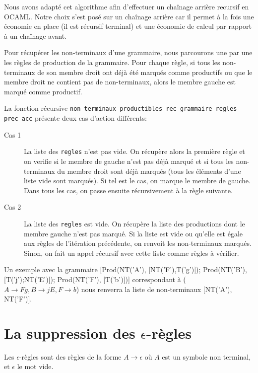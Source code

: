 \documentclass[11pt,a4paper]{article}
\def\code#1{\texttt{#1}} %
\begin{document}
Nous avons adapté cet algorithme afin d'effectuer un chaînage arrière recursif en OCAML. Notre choix s'est posé sur un chaînage arrière car il permet à la fois une économie en place (il est récursif terminal) et une économie de calcul par rapport à un chaînage avant.
\newline

Pour récupérer les non-terminaux d'une grammaire, nous parcourons une par une les règles 
de production de la grammaire. Pour chaque règle, si tous les non-terminaux de son membre droit ont déjà  été marqués comme productifs ou que le membre droit ne contient pas de non-terminaux, alors le membre gauche est marqué comme productif.

La fonction récursive \code{non\_terminaux\_productibles\_rec grammaire regles prec acc} présente deux cas d'action différents:

\begin{description}
    \item[Cas 1] La liste des \code{regles} n'est pas vide. On récupère alors la première règle et on verifie si le membre de gauche n'est pas déjà marqué et si tous les non-terminaux du membre droit sont déjà marqués (tous les éléments d'une liste vide sont marqués). Si tel est le cas, on marque le membre de gauche. Dans tous les cas, on passe ensuite récursivement à la règle suivante.
    \item[Cas 2] La liste des \code{regles} est vide. On récupère la liste des productions dont le membre gauche n'est pas marqué. Si la liste est vide ou qu'elle est égale aux règles de l'itération précédente, on renvoit les non-terminaux marqués. Sinon, on fait un appel récursif avec cette liste comme règles à vérifier.
\end{description}

Un exemple avec la grammaire
[Prod(NT('A'), [NT('F'),T('g')]);
 Prod(NT('B'), [T('j');NT('E')]);
 Prod(NT('F'), [T('b')])] 
correspondant à ($A \rightarrow Fg, B \rightarrow jE, F \rightarrow b$) nous renverra la liste de non-terminaux [NT('A'), NT('F')].

\newpage


\section{La suppression des $\epsilon$-règles}

Les $\epsilon$-règles sont des règles de la forme 
$A \rightarrow \epsilon$ où $A$ est un symbole non
terminal, et $\epsilon$ le mot vide.
\end{document}
